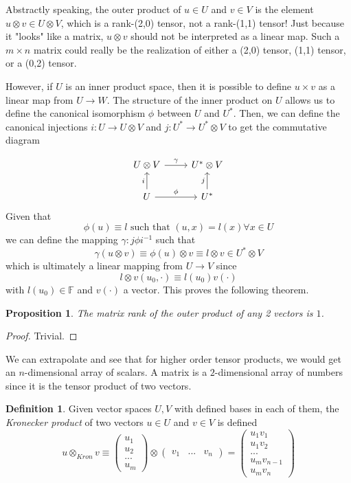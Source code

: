 \documentclass{article}
\newtheorem{proposition}[theorem]{Proposition}
\theoremstyle{remark}
\theoremstyle{definition}
\newtheorem{definition}{Definition}[section]
\begin{document}
    Abstractly speaking, the outer product of $u \in U$ and $v \in V$ is the element $u \otimes v \in U \otimes V$, which is a rank-(2,0) tensor, not a rank-(1,1) tensor! Just because it "looks" like a matrix, $u \otimes v$ should not be interpreted as a linear map. Such a $m \times n$ matrix could really be the realization of either a (2,0) tensor, (1,1) tensor, or a (0,2) tensor. 

    However, if $U$ is an inner product space, then it is possible to define $u \times v$ as a linear map from $U \longrightarrow W$. The structure of the inner product on $U$ allows us to define the canonical isomorphism $\phi$ between $U$ and $U^*$. Then, we can define the canonical injections $i: U \longrightarrow U \otimes V$ and $j: U^* \longrightarrow U^* \otimes V$ to get the commutative diagram 

    \[\begin{tikzcd}
        U \otimes V \arrow{r}{\gamma} & U^* \otimes V \\
        U \arrow{u}{i} \arrow{r}{\phi} & U^* \arrow{u}{j}
    \end{tikzcd}\]
    Given that 
    \[\phi(u) \equiv l \text{ such that } (u, x) = l(x) \forall x \in U\]
    we can define the mapping $\gamma: j \phi i^{-1}$ such that 
    \[\gamma (u \otimes v) \equiv \phi(u) \otimes v \equiv l \otimes v \in U^* \otimes V\]
    which is ultimately a linear mapping from $U \longrightarrow V$ since
    \[l \otimes v (u_0, \cdot) \equiv l(u_0) v(\cdot)\]
    with $l(u_0) \in \mathbb{F}$ and $v(\cdot)$ a vector. This proves the following theorem. 

    \begin{proposition}
    The matrix rank of the outer product of any 2 vectors is $1$. 
    \end{proposition}
    \begin{proof}
    Trivial.
    \end{proof}

    We can extrapolate and see that for higher order tensor products, we would get an $n$-dimensional array of scalars. A matrix is a $2$-dimensional array of numbers since it is the tensor product of two vectors. 

    \begin{definition}
    Given vector spaces $U, V$ with defined bases in each of them, the \textit{Kronecker product} of two vectors $u \in U$ and $v \in V$ is defined
    \[u \otimes_{Kron} v \equiv \begin{pmatrix}
    u_1 \\ u_2 \\ ... \\ u_m
    \end{pmatrix} \otimes \begin{pmatrix}
    v_1 & ... & v_n
    \end{pmatrix} = \begin{pmatrix}
    u_1 v_1 \\ u_1 v_2 \\ ... \\ u_m v_{n-1} \\ u_m v_n 
    \end{pmatrix}\]
    \end{definition}
\end{document}
